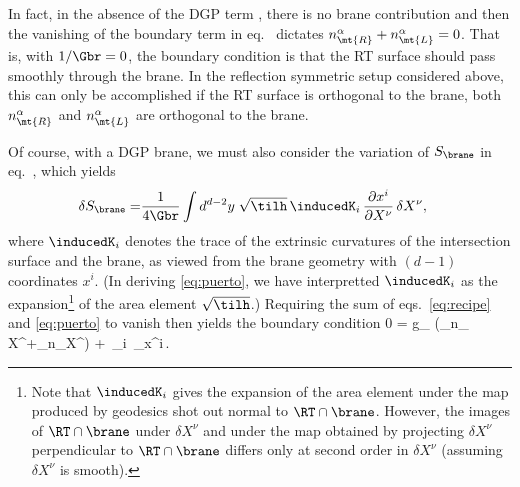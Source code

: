 In fact, in the absence of the DGP term , there is no brane contribution  and then the vanishing of the boundary term in eq.~ dictates $n_\mt{R}^\alpha+n_\mt{L}^\alpha=0$. That is, with $1/\Gbr=0$, the boundary condition is that the RT surface should pass smoothly through the brane. In the reflection symmetric setup considered above, this can only be accomplished if the RT surface is orthogonal to the brane, \ie both $n_\mt{R}^\alpha$ and $n_\mt{L}^\alpha$ are orthogonal to the brane.

Of course, with a DGP brane, we must also consider the variation of $S_\brane$ in eq.~, which yields
\begin{align}
  \delta S_\brane
  =& \frac{1}{4\Gbr}
  \int d^{d-2}y\; \sqrt{\tilh}\,
  \inducedK_i \,\frac{\partial x^i}{\partial X^\nu}\, \delta X^\nu,
  \label{eq:puerto}
\end{align}
where $\inducedK_i$ denotes the trace of the extrinsic curvatures of the intersection surface and the brane, as viewed from the brane geometry with $(d-1)$ coordinates $x^i$. (In deriving \eqref{eq:puerto}, we have interpretted $\inducedK_i$ as the expansion\footnote{Note that $\inducedK_i$ gives the expansion of the area element under the map produced by geodesics shot out normal to $\RT\cap\brane$. However, the images of $\RT\cap\brane$ under $\delta X^\nu$ and under the map obtained by projecting $\delta X^\nu$ perpendicular to $\RT\cap\brane$ differs only at second order in $\delta X^\nu$ (assuming $\delta X^\nu$ is smooth). } of the area element $\sqrt{\tilh}$.)
Requiring the sum of eqs.~\eqref{eq:recipe} and \eqref{eq:puerto} to vanish then yields the boundary condition
\beq\label{ortho7}
 0  =  g_{\mu\nu} (\partial_{n_} X^\mu+\partial_{n_}X^\mu)
  + \,\inducedK_i \,\partial_\nu x^i\,.
\eeq
